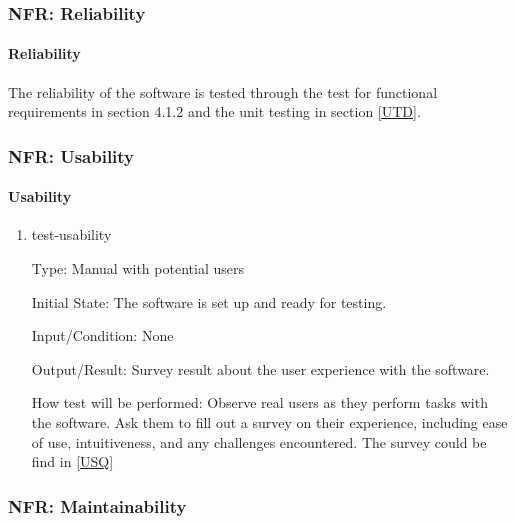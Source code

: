 \documentclass[12pt, titlepage]{article}
\begin{document}


\subsubsection{NFR: Reliability}\label{t_reliability}
		
\paragraph{Reliability}

The reliability of the software is tested through the test for functional requirements in section 4.1.2 and the unit testing in section \ref{UTD}.					

\subsubsection{NFR: Usability}\label{t_usability}
		
\paragraph{Usability}

\begin{enumerate}

\item{test-usability}

Type: Manual with potential users
					
Initial State: The software is set up and ready for testing.
					
Input/Condition: None
					
Output/Result: Survey result about the user experience with the software.
					
How test will be performed: Observe real users as they perform tasks with the software. Ask them to fill out a survey on their experience, including ease of use, intuitiveness, and any challenges encountered. The survey could be find in \ref{USQ}
\end{enumerate}

		
\subsubsection{NFR: Maintainability}\label{t_maintainability}
		
\end{document}
